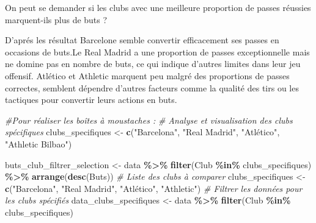 \documentclass[
]{article}
\newenvironment{Shaded}{\begin{snugshade}}{\end{snugshade}}
\newcommand{\CommentTok}[1]{\textcolor[rgb]{0.56,0.35,0.01}{\textit{#1}}}
\newcommand{\FunctionTok}[1]{\textcolor[rgb]{0.13,0.29,0.53}{\textbf{#1}}}
\newcommand{\NormalTok}[1]{#1}
\newcommand{\OtherTok}[1]{\textcolor[rgb]{0.56,0.35,0.01}{#1}}
\newcommand{\SpecialCharTok}[1]{\textcolor[rgb]{0.81,0.36,0.00}{\textbf{#1}}}
\newcommand{\StringTok}[1]{\textcolor[rgb]{0.31,0.60,0.02}{#1}}
\begin{document}
On peut se demander si les clubs avec une meilleure proportion de passes
réussies marquent-ils plus de buts ?

D'aprés les résultat Barcelone semble convertir efficacement ses passes
en occasions de buts.Le Real Madrid a une proportion de passes
exceptionnelle mais ne domine pas en nombre de buts, ce qui indique
d'autres limites dans leur jeu offensif. Atlético et Athletic marquent
peu malgré des proportions de passes correctes, semblent dépendre
d'autres facteurs comme la qualité des tirs ou les tactiques pour
convertir leurs actions en buts.

\begin{Shaded}
\begin{Highlighting}[]
\CommentTok{\#Pour réaliser les boîtes à moustaches :}
\CommentTok{\# Analyse et visualisation des clubs spécifiques}
\NormalTok{clubs\_specifiques }\OtherTok{\textless{}{-}} \FunctionTok{c}\NormalTok{(}\StringTok{"Barcelona"}\NormalTok{, }\StringTok{"Real Madrid"}\NormalTok{, }\StringTok{"Atlético"}\NormalTok{, }\StringTok{"Athletic Bilbao"}\NormalTok{)}

\NormalTok{buts\_club\_filtrer\_selection }\OtherTok{\textless{}{-}}\NormalTok{ data }\SpecialCharTok{\%\textgreater{}\%}
  \FunctionTok{filter}\NormalTok{(Club }\SpecialCharTok{\%in\%}\NormalTok{ clubs\_specifiques) }\SpecialCharTok{\%\textgreater{}\%} 
  \FunctionTok{arrange}\NormalTok{(}\FunctionTok{desc}\NormalTok{(Buts))}
\CommentTok{\# Liste des clubs à comparer}
\NormalTok{clubs\_specifiques }\OtherTok{\textless{}{-}} \FunctionTok{c}\NormalTok{(}\StringTok{"Barcelona"}\NormalTok{, }\StringTok{"Real Madrid"}\NormalTok{, }\StringTok{"Atlético"}\NormalTok{, }\StringTok{"Athletic"}\NormalTok{)}
\CommentTok{\# Filtrer les données pour les clubs spécifiés}
\NormalTok{data\_clubs\_specifiques }\OtherTok{\textless{}{-}}\NormalTok{ data }\SpecialCharTok{\%\textgreater{}\%}
  \FunctionTok{filter}\NormalTok{(Club }\SpecialCharTok{\%in\%}\NormalTok{ clubs\_specifiques)}


\end{Highlighting}
\end{Shaded}
\end{document}
